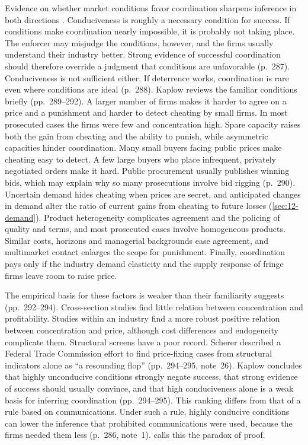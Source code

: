 Evidence on whether market conditions favor coordination sharpens inference in both directions
\citep[pp.~286--288]{Kaplow2013}. Conduciveness is roughly a necessary condition for success. If conditions make
coordination nearly impossible, it is probably not taking place. The enforcer may misjudge the conditions,
however, and the firms usually understand their industry better. Strong evidence of successful coordination should
therefore override a judgment that conditions are unfavorable (p.~287). Conduciveness is not sufficient either. If
deterrence works, coordination is rare even where conditions are ideal (p.~288). Kaplow reviews the familiar
conditions briefly (pp.~289--292). A larger number of firms makes it harder to agree on a price and a punishment
and harder to detect cheating by small firms. In most prosecuted cases the firms were few and concentration high. Spare capacity raises both the gain from cheating and the ability to punish, while asymmetric capacities
hinder coordination. Many small buyers facing public prices make cheating easy to detect. A few large buyers who
place infrequent, privately negotiated orders make it hard. Public procurement usually publishes winning bids, which
may explain why so many prosecutions involve bid rigging (p.~290). Uncertain demand hides cheating when prices are
secret, and anticipated changes in demand alter the ratio of current gains from cheating to future losses
(\cref{sec:12-demand}). Product heterogeneity complicates agreement and the policing of quality and terms, and most
prosecuted cases involve homogeneous products. Similar costs, horizons and managerial backgrounds ease agreement,
and multimarket contact enlarges the scope for punishment. Finally, coordination pays only if the industry demand
elasticity and the supply response of fringe firms leave room to raise price.

The empirical basis for these factors is weaker than their familiarity suggests (pp.~292--294). Cross-section
studies find little relation between concentration and profitability. Studies within an industry find a more
robust positive relation between concentration and price, although cost differences and endogeneity complicate
them. Structural screens have a poor record. Scherer described a Federal Trade Commission effort to find
price-fixing cases from structural indicators alone as ``a resounding flop'' (pp.~294--295, note~26). Kaplow concludes
that highly unconducive conditions strongly negate success, that strong evidence of success should usually
convince, and that high conduciveness alone is a weak basis for inferring coordination (pp.~294--295). This ranking
differs from that of a rule based on communications. Under such a rule, highly conducive conditions can lower the
inference that prohibited communications were used, because the firms needed them less (p.~286, note~1).
 calls this the paradox of proof.

